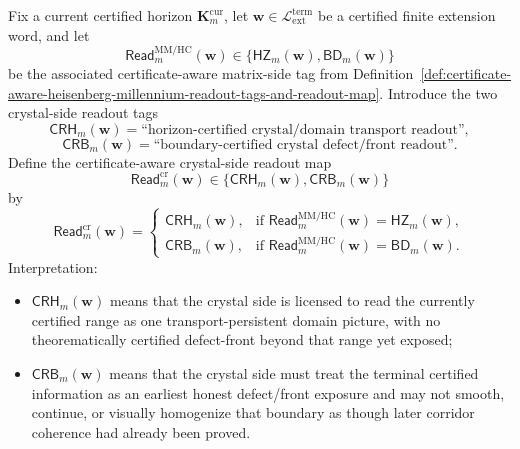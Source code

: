 \begin{definition}
\label{def:certificate-aware-crystal-readout-tags-and-crystal-side-readout-map}
Fix a current certified horizon \(\mathbf K_m^{\mathrm{cur}}\), let \(\mathbf w\in \mathcal L_{\mathrm{ext}}^{\mathrm{term}}\) be a certified finite extension word, and let
\[
  \mathsf{Read}^{\mathrm{MM/HC}}_{m}(\mathbf w)
  \in
  \{\mathsf{HZ}_{m}(\mathbf w),\mathsf{BD}_{m}(\mathbf w)\}
\]
be the associated certificate-aware matrix-side tag from Definition~\ref{def:certificate-aware-heisenberg-millennium-readout-tags-and-readout-map}. Introduce the two crystal-side readout tags
\[
  \mathsf{CRH}_{m}(\mathbf w)=\text{``horizon-certified crystal/domain transport readout''},
\]
\[
  \mathsf{CRB}_{m}(\mathbf w)=\text{``boundary-certified crystal defect/front readout''}.
\]
Define the certificate-aware crystal-side readout map
\[
  \mathsf{Read}^{\mathrm{cr}}_{m}(\mathbf w)
  \in
  \{\mathsf{CRH}_{m}(\mathbf w),\mathsf{CRB}_{m}(\mathbf w)\}
\]
by
\[
  \mathsf{Read}^{\mathrm{cr}}_{m}(\mathbf w)
  =
  \begin{cases}
    \mathsf{CRH}_{m}(\mathbf w), & \text{if }\mathsf{Read}^{\mathrm{MM/HC}}_{m}(\mathbf w)=\mathsf{HZ}_{m}(\mathbf w),\\[2mm]
    \mathsf{CRB}_{m}(\mathbf w), & \text{if }\mathsf{Read}^{\mathrm{MM/HC}}_{m}(\mathbf w)=\mathsf{BD}_{m}(\mathbf w).
  \end{cases}
\]
Interpretation:
\begin{itemize}[leftmargin=2em]
  \item \(\mathsf{CRH}_{m}(\mathbf w)\) means that the crystal side is licensed to read the currently certified range as one transport-persistent domain picture, with no theorematically certified defect-front beyond that range yet exposed;
  \item \(\mathsf{CRB}_{m}(\mathbf w)\) means that the crystal side must treat the terminal certified information as an earliest honest defect/front exposure and may not smooth, continue, or visually homogenize that boundary as though later corridor coherence had already been proved.
\end{itemize}
\end{definition}

